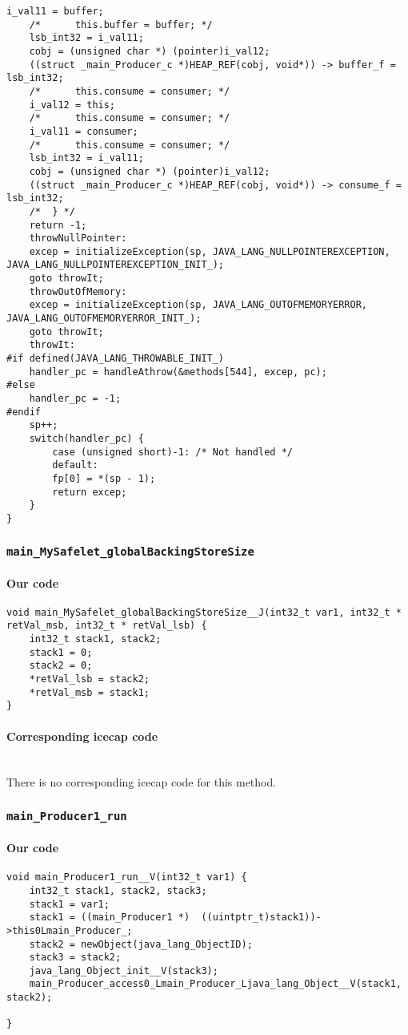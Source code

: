\begin{lstlisting}[firstnumber=56455]
	i_val11 = buffer;
	/*		this.buffer = buffer; */
	lsb_int32 = i_val11;
	cobj = (unsigned char *) (pointer)i_val12;
	((struct _main_Producer_c *)HEAP_REF(cobj, void*)) -> buffer_f = lsb_int32;
	/*		this.consume = consumer; */
	i_val12 = this;
	/*		this.consume = consumer; */
	i_val11 = consumer;
	/*		this.consume = consumer; */
	lsb_int32 = i_val11;
	cobj = (unsigned char *) (pointer)i_val12;
	((struct _main_Producer_c *)HEAP_REF(cobj, void*)) -> consume_f = lsb_int32;
	/*	} */
	return -1;
	throwNullPointer:
	excep = initializeException(sp, JAVA_LANG_NULLPOINTEREXCEPTION, JAVA_LANG_NULLPOINTEREXCEPTION_INIT_);
	goto throwIt;
	throwOutOfMemory:
	excep = initializeException(sp, JAVA_LANG_OUTOFMEMORYERROR, JAVA_LANG_OUTOFMEMORYERROR_INIT_);
	goto throwIt;
	throwIt:
#if defined(JAVA_LANG_THROWABLE_INIT_)
	handler_pc = handleAthrow(&methods[544], excep, pc);
#else
	handler_pc = -1;
#endif
	sp++;
	switch(handler_pc) {
		case (unsigned short)-1: /* Not handled */
		default:
		fp[0] = *(sp - 1);
		return excep;
	}
}
\end{lstlisting}

\subsubsection{\texttt{main\_MySafelet\_globalBackingStoreSize}}

\paragraph{Our code}\hfill
\begin{lstlisting}[firstnumber=327]
void main_MySafelet_globalBackingStoreSize__J(int32_t var1, int32_t * retVal_msb, int32_t * retVal_lsb) {
	int32_t stack1, stack2;
	stack1 = 0;
	stack2 = 0;
	*retVal_lsb = stack2;
	*retVal_msb = stack1;
}
\end{lstlisting}

\paragraph{Corresponding icecap code}\hfill\\
There is no corresponding icecap code for this method.

\subsubsection{\texttt{main\_Producer1\_run}}

\paragraph{Our code}\hfill
\begin{lstlisting}[firstnumber=369]
void main_Producer1_run__V(int32_t var1) {
	int32_t stack1, stack2, stack3;
	stack1 = var1;
	stack1 = ((main_Producer1 *)  ((uintptr_t)stack1))->this0Lmain_Producer_;
	stack2 = newObject(java_lang_ObjectID);
	stack3 = stack2;
	java_lang_Object_init__V(stack3);
	main_Producer_access0_Lmain_Producer_Ljava_lang_Object__V(stack1, stack2);

}
\end{lstlisting}

